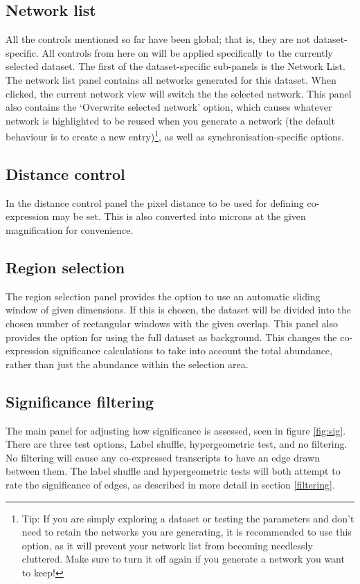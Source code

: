 \documentclass[a4paper,12pt]{article}
\begin{document}
\subsection{Network list}
All the controls mentioned so far have been global; that is, they are not dataset-specific. All controls from here on will be applied specifically to the currently selected dataset. The first of the dataset-specific sub-panels is the Network List. The network list panel contains all networks generated for this dataset. When clicked, the current network view will switch the the selected network. This panel also contains the `Overwrite selected network' option, which causes whatever network is highlighted to be reused when you generate a network (the default behaviour is to create a new entry)\footnote{Tip: If you are simply exploring a dataset or testing the parameters and don't need to retain the networks you are generating, it is recommended to use this option, as it will prevent your network list from becoming needlessly cluttered. Make sure to turn it off again if you generate a network you want to keep!}, as well as synchronisation-specific options.

\subsection{Distance control}
In the distance control panel the pixel distance to be used for defining co-expression may be set. This is also converted into microns at the given magnification for convenience.
\subsection{Region selection}
The region selection panel provides the option to use an automatic sliding window of given dimensions. If this is chosen, the dataset will be divided into the chosen number of rectangular windows with the given overlap. This panel also provides the option for using the full dataset as background. This changes the co-expression significance calculations to take into account the total abundance, rather than just the abundance within the selection area.
\subsection{Significance filtering}
The main panel for adjusting how significance is assessed, seen in figure \ref{fig:sig}. There are three test options, Label shuffle, hypergeometric test, and no filtering. No filtering will cause any co-expressed transcripts to have an edge drawn between them. The label shuffle and hypergeometric tests will both attempt to rate the significance of edges, as described in more detail in section \ref{filtering}.
\end{document}
